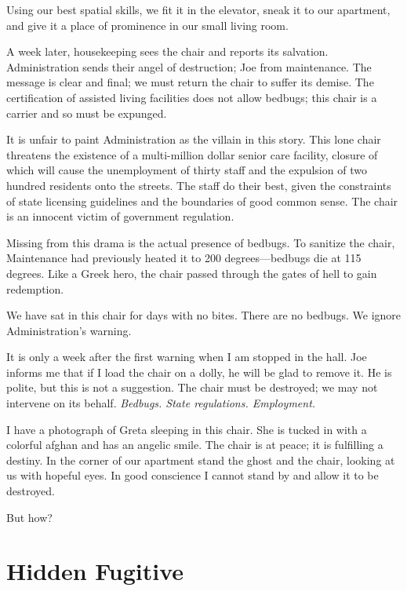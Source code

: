 \documentclass[
  letterpaper,
  DIV=11,
  numbers=noendperiod]{scrreprt}
\begin{document}
Using our best spatial skills, we fit it in the elevator, sneak it to
our apartment, and give it a place of prominence in our small living
room.

A week later, housekeeping sees the chair and reports its salvation.
Administration sends their angel of destruction; Joe from maintenance.
The message is clear and final; we must return the chair to suffer its
demise. The certification of assisted living facilities does not allow
bedbugs; this chair is a carrier and so must be expunged.

It is unfair to paint Administration as the villain in this story. This
lone chair threatens the existence of a multi-million dollar senior care
facility, closure of which will cause the unemployment of thirty staff
and the expulsion of two hundred residents onto the streets. The staff
do their best, given the constraints of state licensing guidelines and
the boundaries of good common sense. The chair is an innocent victim of
government regulation.

Missing from this drama is the actual presence of bedbugs. To sanitize
the chair, Maintenance had previously heated it to 200 degrees---bedbugs
die at 115 degrees. Like a Greek hero, the chair passed through the
gates of hell to gain redemption.

We have sat in this chair for days with no bites. There are no bedbugs.
We ignore Administration's warning.

It is only a week after the first warning when I am stopped in the hall.
Joe informs me that if I load the chair on a dolly, he will be glad to
remove it. He is polite, but this is not a suggestion. The chair must be
destroyed; we may not intervene on its behalf. \emph{Bedbugs. State
regulations. Employment.}

I have a photograph of Greta sleeping in this chair. She is tucked in
with a colorful afghan and has an angelic smile. The chair is at peace;
it is fulfilling a destiny. In the corner of our apartment stand the
ghost and the chair, looking at us with hopeful eyes. In good conscience
I cannot stand by and allow it to be destroyed.

But how?

\section*{Hidden Fugitive}\label{hidden-fugitive}

\end{document}
